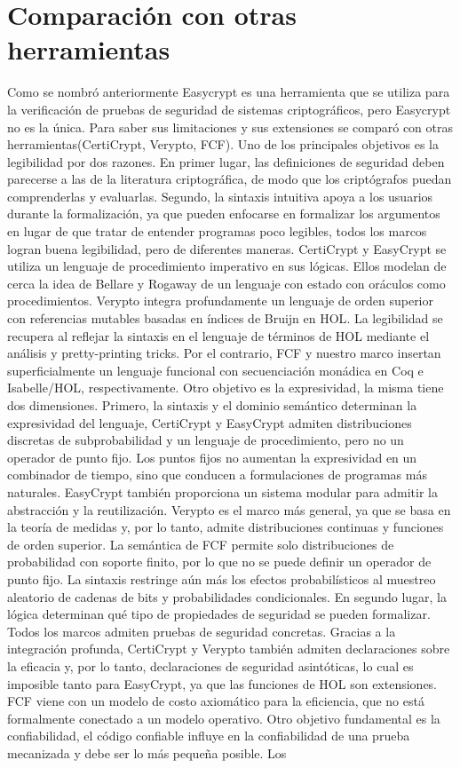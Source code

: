 \documentclass[runningheads]{llncs}
\begin{document}
\section{Comparación con otras herramientas}
Como se nombró anteriormente Easycrypt es una herramienta que se utiliza para la verificación de pruebas de seguridad de sistemas criptográficos, pero Easycrypt no es la única. Para saber sus limitaciones y sus extensiones se comparó con otras herramientas(CertiCrypt, Verypto, FCF). Uno de los principales objetivos es la legibilidad por dos razones. En primer lugar, las definiciones de seguridad deben parecerse a las de la literatura criptográfica, de modo que los criptógrafos puedan comprenderlas y evaluarlas. Segundo, la sintaxis intuitiva apoya a los usuarios durante la formalización, ya que pueden enfocarse en formalizar los argumentos en lugar de que tratar de entender programas poco legibles, todos los marcos logran buena legibilidad, pero de diferentes maneras. CertiCrypt y EasyCrypt se utiliza un lenguaje de procedimiento imperativo en sus lógicas. Ellos modelan de cerca la idea de Bellare y Rogaway de un lenguaje con estado con oráculos como procedimientos\cite{ref_article2}. Verypto integra profundamente un lenguaje de orden superior con referencias mutables basadas en índices de Bruijn en HOL\cite{ref_article3}. La legibilidad se recupera al reflejar la sintaxis en el lenguaje de términos de HOL mediante el análisis y pretty-printing tricks. Por el contrario, FCF y nuestro marco insertan superficialmente un lenguaje funcional con secuenciación monádica en Coq e Isabelle/HOL, respectivamente\cite{ref_article4}. Otro objetivo es la expresividad, la misma tiene dos dimensiones. Primero, la sintaxis y el dominio semántico determinan la expresividad del lenguaje, CertiCrypt y EasyCrypt admiten distribuciones discretas de subprobabilidad y un lenguaje de procedimiento, pero no un operador de punto fijo. Los puntos fijos no aumentan la expresividad en un combinador de tiempo, sino que conducen a formulaciones de programas más naturales. EasyCrypt también proporciona un sistema modular para admitir la abstracción y la reutilización. Verypto es el marco más general, ya que se basa en la teoría de medidas y, por lo tanto, admite distribuciones continuas y funciones de orden superior. La semántica de FCF permite solo distribuciones de probabilidad con soporte finito, por lo que no se puede definir un operador de punto fijo. La sintaxis restringe aún más los efectos probabilísticos al muestreo aleatorio de cadenas de bits y probabilidades condicionales. En segundo lugar, la lógica determinan qué tipo de propiedades de seguridad se pueden formalizar. Todos los marcos admiten pruebas de seguridad concretas. Gracias a la integración profunda, CertiCrypt y Verypto también admiten declaraciones sobre la eficacia y, por lo tanto, declaraciones de seguridad asintóticas, lo cual es imposible tanto para EasyCrypt, ya que las funciones de HOL son extensiones. FCF viene con un modelo de costo axiomático para la eficiencia, que no está formalmente conectado a un modelo operativo. Otro objetivo fundamental es la confiabilidad, el código confiable influye en la confiabilidad de una prueba mecanizada y debe ser lo más pequeña posible. Los 
\end{document}
